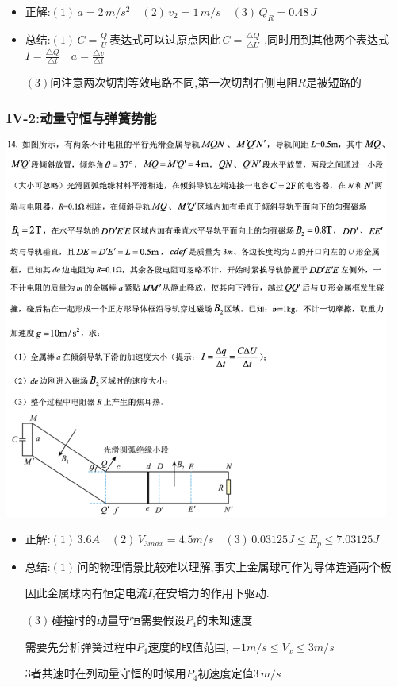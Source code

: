 \documentclass{article}
\begin{document}
\begin{itemize}
    \item 正解:\quad $(1) \, a = 2 \, m/s^{2} \quad (2) \, v_{2} = 1 \, m/s \quad (3) \, Q_{R} = 0.48 \, J$
    \item 总结:\quad $(1) \, C = \frac{Q}{U} \, \text{表达式可以过原点因此} \, C = \frac{\triangle Q}{\triangle U}$
          ,同时用到其他两个表达式$I = \frac{\triangle Q}{\triangle t} \quad a = \frac{\triangle v}{\triangle t}$

          \hspace{3.2em}$(3)$问注意两次切割等效电路不同,第一次切割右侧电阻$R$是被短路的
\end{itemize}

\vspace{2em}

\subsubsection{IV-2:动量守恒与弹簧势能}
\includegraphics[width=0.95\textwidth,keepaspectratio]{./pictures/3.10-2.png}

\begin{itemize}
    \item 正解:\quad $(1) \, 3.6A \quad (2) \, V_{3max} = 4.5 m/s \quad (3) \, 0.03125 J \leq E_{p} \leq 7.03125 J $
    \item 总结:\quad $(1) \,$问的物理情景比较难以理解,事实上金属球可作为导体连通两个板

          \hspace{3.2em}因此金属球内有恒定电流$I$,在安培力的作用下驱动.

          \hspace{3.2em}$(3) \,$碰撞时的动量守恒需要假设$P_{4}$的未知速度

          \hspace{3.2em}需要先分析弹簧过程中$P_{4}$速度的取值范围, $-1m/s \leq V_{x} \leq 3 m/s$

          \hspace{3.2em}$3$者共速时在列动量守恒的时候用$P_{4}$初速度定值$3 \, m/s$
\end{itemize}
\end{document}
